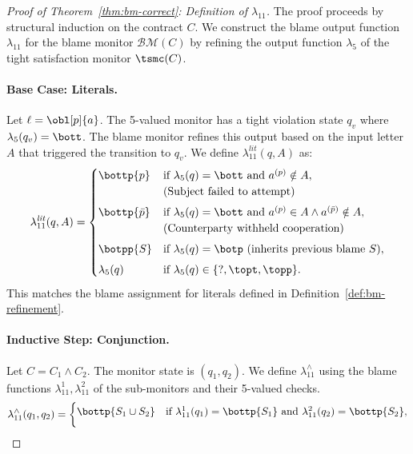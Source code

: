   \begin{proof}[Proof of Theorem~\ref{thm:bm-correct}: Definition of $\lambda_{11}$]
    The proof proceeds by structural induction on the contract $C$. We construct the blame output function $\lambda_{11}$ for the blame monitor $\mathcal{BM}(C)$ by refining the output function $\lambda_5$ of the tight satisfaction monitor $\tsmc(C)$.
    
    \paragraph{Base Case: Literals.}
    Let $\ell = \obl[p]{a}$. The 5-valued monitor has a tight violation state $q_v$ where $\lambda_5(q_v)=\bott$.
    The blame monitor refines this output based on the input letter $A$ that triggered the transition to $q_v$.
    We define $\lambda_{11}^{\mathit{lit}}(q, A)$ as:
    \[
    \lambda_{11}^{\mathit{lit}}(q, A) = 
    \begin{cases}
      \bottp{p} 
        & \text{if } \lambda_5(q)=\bott \text{ and } a^{(p)} \notin A, \\
        & \text{(Subject failed to attempt)} \\[4pt]
      \bottp{\bar{p}} 
        & \text{if } \lambda_5(q)=\bott \text{ and } a^{(p)} \in A \land a^{(\bar{p})} \notin A, \\
        & \text{(Counterparty withheld cooperation)} \\[4pt]
      \botpp{S}
        & \text{if } \lambda_5(q)=\botp \text{ (inherits previous blame } S), \\[4pt]
      \lambda_5(q) 
        & \text{if } \lambda_5(q) \in \{\mathsf{?}, \topt, \topp\}.
    \end{cases}
    \]
    This matches the blame assignment for literals defined in Definition~\ref{def:bm-refinement}.
    
    \paragraph{Inductive Step: Conjunction.}
    Let $C = C_1 \wedge C_2$. The monitor state is $(q_1, q_2)$.
    We define $\lambda_{11}^{\wedge}$ using the blame functions $\lambda_{11}^1, \lambda_{11}^2$ of the sub-monitors and their 5-valued checks.
    \[
    \lambda_{11}^{\wedge}(q_1, q_2) = 
    \begin{cases}
      \bottp{S_1 \cup S_2} 
        & \text{if } \lambda_{11}^1(q_1)=\bottp{S_1} \text{ and } \lambda_{11}^2(q_2)=\bottp{S_2}, \\[6pt]
    

\end{cases}\]
\end{proof}
